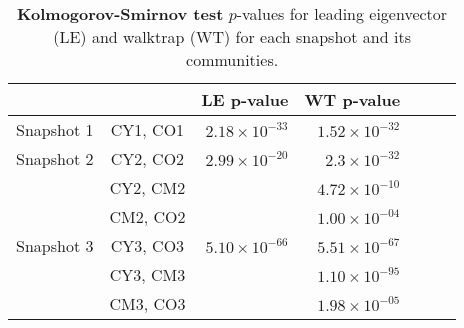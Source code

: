 \begin{table}
\small
\centering
\caption[Kolmogorov-Smirnov test]{\textbf{Kolmogorov-Smirnov test} $p$-values for leading eigenvector (LE) and walktrap (WT) for each snapshot and its communities.}
\label{tab:pvalues2}
\vspace*{5mm}
\begin{tabular}{lcrrrrr}
	\toprule

	 & & LE p-value & WT p-value\\
	\midrule 
	\quad Snapshot 1     & CY1, CO1 & $2.18\times10^{-33}$ & $1.52\times10^{-32}$ \\
	\midrule   							
	\quad Snapshot 2     & CY2, CO2 & $2.99\times10^{-20}$ & $2.3\times10^{-32}$ \\
					    & CY2, CM2 &          & $4.72\times10^{-10}$\\
					    & CM2, CO2 &          & $1.00\times10^{-04}$\\
	\midrule  
	\quad Snapshot 3     & CY3, CO3 & $5.10\times10^{-66}$ & $5.51\times10^{-67}$\\
					    & CY3, CM3 &          & $1.10\times10^{-95}$\\
						& CM3, CO3 &          & $1.98\times10^{-05}$\\ 
	\bottomrule
\end{tabular}
\end{table}